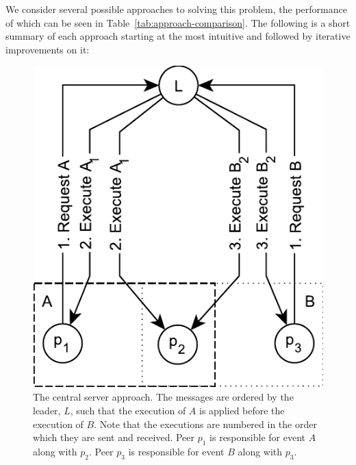 \documentclass{article}
\begin{document}
	We consider several possible approaches to solving this problem, the performance of which can be seen in Table~\ref{tab:approach-comparison}.
	The following is a short summary of each approach starting at the most intuitive and followed by iterative improvements on it:

    \FloatBarrier
    \begin{figure}[ht!]
        \center
        \includegraphics[scale=0.7]{figures/dcr-graphs/central-server-approach}
        \caption{The central server approach.
        The messages are ordered by the leader, $L$, such that the execution of $A$ is applied before the execution of $B$.
        Note that the executions are numbered in the order which they are sent and received.
        Peer $p_1$ is responsible for event $A$ along with $p_2$.
        Peer $p_3$ is responsible for event $B$ along with $p_3$.}
        \label{fig:central-server-approach}
    \end{figure}
    \FloatBarrier
\end{document}
